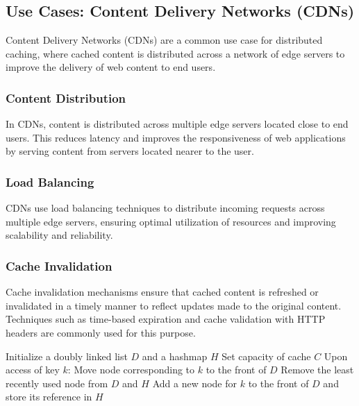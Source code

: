 \documentclass[12pt]{book} %
\begin{document}
\subsection{Use Cases: Content Delivery Networks (CDNs)}

Content Delivery Networks (CDNs) are a common use case for distributed caching, where cached content is distributed across a network of edge servers to improve the delivery of web content to end users.

\subsubsection{Content Distribution}
In CDNs, content is distributed across multiple edge servers located close to end users. This reduces latency and improves the responsiveness of web applications by serving content from servers located nearer to the user.

\subsubsection{Load Balancing}
CDNs use load balancing techniques to distribute incoming requests across multiple edge servers, ensuring optimal utilization of resources and improving scalability and reliability.

\subsubsection{Cache Invalidation}
Cache invalidation mechanisms ensure that cached content is refreshed or invalidated in a timely manner to reflect updates made to the original content. Techniques such as time-based expiration and cache validation with HTTP headers are commonly used for this purpose.

\FloatBarrier
\begin{algorithm}
\caption{Least Recently Used (LRU) Cache}
\begin{algorithmic}[1]
\State Initialize a doubly linked list $D$ and a hashmap $H$
\State Set capacity of cache $C$
\State Upon access of key $k$:
    \State Move node corresponding to $k$ to the front of $D$
\Else
        \State Remove the least recently used node from $D$ and $H$
    \EndIf
    \State Add a new node for $k$ to the front of $D$ and store its reference in $H$
\EndIf
\end{algorithmic}
\end{algorithm}
\FloatBarrier
\end{document}
